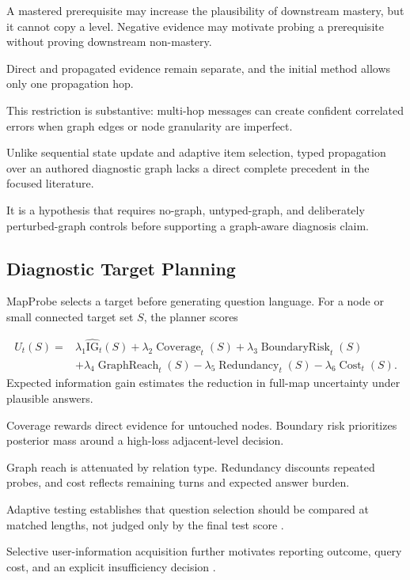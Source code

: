 A mastered prerequisite may increase the plausibility of downstream mastery, but it cannot copy a
level. Negative evidence may motivate probing a prerequisite without proving downstream non-mastery.

Direct and propagated evidence remain separate, and the initial method allows only one propagation hop.

This restriction is substantive: multi-hop messages can create confident correlated errors when graph
edges or node granularity are imperfect.

Unlike sequential state update and adaptive item selection, typed propagation over an authored
diagnostic graph lacks a direct complete precedent in the focused literature.

It is a \knowact hypothesis that requires no-graph, untyped-graph, and deliberately perturbed-graph
controls before supporting a graph-aware diagnosis claim.

\subsection{Diagnostic Target Planning}

MapProbe selects a target before generating question language. For a node or small connected target set
$S$, the planner scores

\begin{align}
    U_t(S) ={}& \lambda_1 \widehat{\mathrm{IG}}_t(S)
    + \lambda_2 \operatorname{Coverage}_t(S)
    + \lambda_3 \operatorname{BoundaryRisk}_t(S) \nonumber\\
    &+ \lambda_4 \operatorname{GraphReach}_t(S)
    - \lambda_5 \operatorname{Redundancy}_t(S)
    - \lambda_6 \operatorname{Cost}_t(S).
\end{align}
Expected information gain estimates the reduction in full-map uncertainty under plausible answers.

Coverage rewards direct evidence for untouched nodes. Boundary risk prioritizes posterior mass around
a high-loss adjacent-level decision.

Graph reach is attenuated by relation type. Redundancy discounts repeated probes, and cost reflects
remaining turns and expected answer burden.

Adaptive testing establishes that question selection should be compared at matched lengths, not judged
only by the final test score \citep{ghosh2021bobcat,liu2025facd}.

Selective user-information acquisition further motivates reporting outcome, query cost, and an explicit
insufficiency decision \citep{wu2025raise}.

